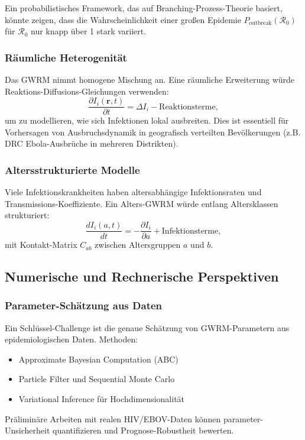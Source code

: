 ﻿\documentclass[a4paper,12pt]{article}
\theoremstyle{definition}
\begin{document}
Ein probabilistisches Framework, das auf Branching-Prozess-Theorie basiert, könnte zeigen, dass die Wahrscheinlichkeit einer großen Epidemie $P_{\text{outbreak}}(\mathcal{R}_0)$ für $\mathcal{R}_0$ nur knapp über 1 stark variiert.

\subsubsection{Räumliche Heterogenität}
Das GWRM nimmt homogene Mischung an. Eine räumliche Erweiterung würde Reaktions-Diffusions-Gleichungen verwenden:
\[
\frac{\partial I_i(\mathbf{r}, t)}{\partial t} = \Delta I_i - \text{Reaktionsterme},
\]
um zu modellieren, wie sich Infektionen lokal ausbreiten. Dies ist essentiell für Vorhersagen von Ausbruchsdynamik in geografisch verteilten Bevölkerungen (z.B. DRC Ebola-Ausbrüche in mehreren Distrikten).

\subsubsection{Altersstrukturierte Modelle}
Viele Infektionskrankheiten haben altersabhängige Infektionsraten und Transmissions-Koeffiziente. Ein Alters-GWRM würde entlang Altersklassen strukturiert:
\[
\frac{dI_i(a,t)}{dt} = -\frac{\partial I_i}{\partial a} + \text{Infektionsterme},
\]
mit Kontakt-Matrix $C_{ab}$ zwischen Altersgruppen $a$ und $b$.

\subsection{Numerische und Rechnerische Perspektiven}

\subsubsection{Parameter-Schätzung aus Daten}
Ein Schlüssel-Challenge ist die genaue Schätzung von GWRM-Parametern aus epidemiologischen Daten. Methoden:
\begin{itemize}
\item Approximate Bayesian Computation (ABC)
\item Particle Filter und Sequential Monte Carlo
\item Variational Inference für Hochdimensionalität
\end{itemize}

Präliminäre Arbeiten mit realen HIV/EBOV-Daten können parameter-Unsicherheit quantifizieren und Prognose-Robustheit bewerten.
\end{document}
